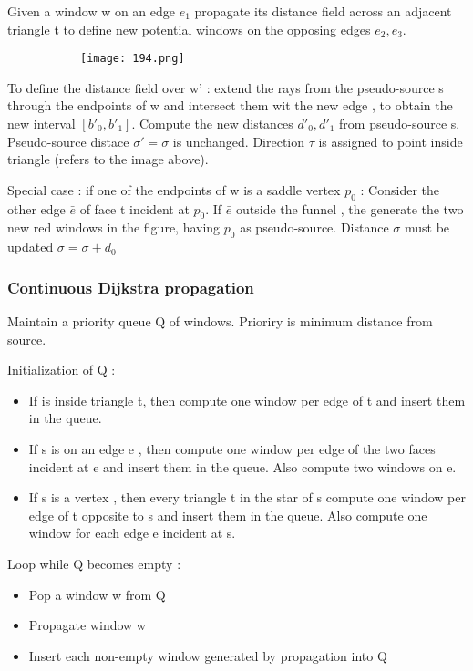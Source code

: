 \documentclass{article}
\begin{document}
Given a window w on an edge $e_1$ propagate its distance field across an adjacent triangle t to define new potential windows on the opposing edges $e_2,e_3$.

  \begin{figure}[ht!]
  \centering
  \begin{subfigure}[b]{0.3\linewidth}
    \texttt{[image: 194.png]}
  \end{subfigure}
\end{figure}

To define the distance field over w' : extend the rays from the pseudo-source s through the endpoints of w and intersect them wit the new edge , to obtain the new interval $[b'_0,b'_1]$. Compute the new distances $d'_0,d'_1$ from pseudo-source s. Pseudo-source distace $\sigma' = \sigma$ is unchanged. Direction $\tau$ is assigned to point inside triangle (refers to the image above).

Special case : if one of the endpoints of w is a saddle vertex $p_0$ : Consider the other edge $\bar e$ of face t incident at $p_0$. If $\bar e$ outside the funnel , the generate the two new red windows in the figure, having $p_0$ as pseudo-source. Distance $\sigma$ must be updated $\sigma = \sigma + d_0$

\subsubsection{Continuous Dijkstra propagation}

Maintain a priority queue Q of windows. Prioriry is minimum distance from source.

Initialization of Q : 

\begin{itemize}
    \item If is inside triangle t, then compute one window per edge of t and insert them in the queue.
    \item If s is on an edge e , then compute one window per edge of the two faces incident at e and insert them in the queue. Also compute two windows on e.
    \item If s is a vertex , then every triangle t in the star of s compute one window per edge of t opposite to s and insert them in the queue. Also compute one window for each edge e incident at s.
\end{itemize}

Loop while Q becomes empty :

\begin{itemize}
    \item Pop a window w from Q
    \item Propagate window w
    \item Insert each non-empty window generated by propagation into Q
\end{itemize}
\end{document}
